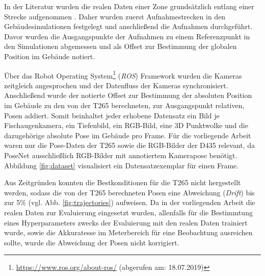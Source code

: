 In der Literatur wurden die realen Daten einer Zone grundsätzlich entlang einer Strecke aufgenommen \cite{kendallPoseNetConvolutionalNetwork2015, clarkVidLocDeepSpatioTemporal2017, acharyaBIMPoseNetIndoorCamera2019}. Daher wurden zuerst Aufnahmestrecken in den Gebäudesimulationen festgelegt und anschließend die Aufnahmen durchgeführt. Davor wurden die Ausgangspunkte der Aufnahmen zu einem Referenzpunkt in den Simulationen abgemessen und als Offset zur Bestimmung der globalen Position im Gebäude notiert.


Über das Robot Operating System\footnote{\url{https://www.ros.org/about-ros/} (abgerufen am: 18.07.2019)} (\textit{ROS}) Framework wurden die Kameras zeitgleich angesprochen und der Datenfluss der Kameras synchronisiert. Anschließend wurde der notierte Offset zur Bestimmung der absoluten Position im Gebäude zu den von der T265 berechneten, zur Ausgangspunkt relativen, Posen addiert. Somit beinhaltet jeder erhobene Datensatz ein Bild je Fischaugenkamera, ein Tiefenbild, ein RGB-Bild, eine 3D Punktwolke und die dazugehörige absolute Pose im Gebäude pro Frame. Für die vorliegende Arbeit waren nur die Pose-Daten der T265 sowie die RGB-Bilder der D435 relevant, da PoseNet ausschließlich RGB-Bilder mit annotiertem Kamerapose benötigt. Abbildung \ref{fig:dataset} visualisiert ein Datensatzexemplar für einen Frame.

Aus Zeitgründen konnten die Bestkonditionen für die T265 nicht hergestellt werden, sodass die von der T265 berechneten Posen eine Abweichung (\textit{Drift}) bis zur 5\% (vgl. Abb. \ref{fig:trajectories}) aufweisen. Da in der vorliegenden Arbeit die realen Daten zur Evaluierung eingesetzt wurden, allenfalls für die Bestimmtung eines Hyperparameters zwecks der Evaluierung mit den realen Daten trainiert wurde, sowie die Akkuratesse im Meterbereich für eine Beobachtung ausreichen sollte, wurde die Abweichung der Posen nicht korrigiert.


